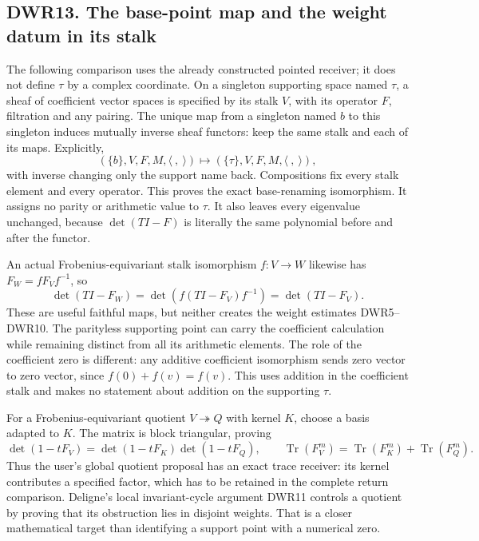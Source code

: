 \subsection{DWR13. The base-point map and the weight datum in its
stalk}\label{dwr13.-the-base-point-map-and-the-weight-datum-in-its-stalk}

The following comparison uses the already constructed pointed receiver;
it does not define \(\tau\) by a complex coordinate. On a singleton
supporting space named \(\tau\), a sheaf of coefficient vector spaces is
specified by its stalk \(V\), with its operator \(F\), filtration and
any pairing. The unique map from a singleton named \(b\) to this
singleton induces mutually inverse sheaf functors: keep the same stalk
and each of its maps. Explicitly, \[
(\{b\},V,F,M,\langle\ ,\ \rangle)
\longmapsto(\{\tau\},V,F,M,\langle\ ,\ \rangle),
\tag{DWR13.1}
\] with inverse changing only the support name back. Compositions fix
every stalk element and every operator. This proves the exact
base-renaming isomorphism. It assigns no parity or arithmetic value to
\(\tau\). It also leaves every eigenvalue unchanged, because
\(\det(TI-F)\) is literally the same polynomial before and after the
functor.

An actual Frobenius-equivariant stalk isomorphism \(f:V\to W\) likewise
has \(F_W=fF_Vf^{-1}\), so \[
\det(TI-F_W)=\det(f(TI-F_V)f^{-1})=\det(TI-F_V).
\tag{DWR13.2}
\] These are useful faithful maps, but neither creates the weight
estimates DWR5--DWR10. The parityless supporting point can carry the
coefficient calculation while remaining distinct from all its arithmetic
elements. The role of the coefficient zero is different: any additive
coefficient isomorphism sends zero vector to zero vector, since
\(f(0)+f(v)=f(v)\). This uses addition in the coefficient stalk and
makes no statement about addition on the supporting \(\tau\).

For a Frobenius-equivariant quotient \(V\twoheadrightarrow Q\) with
kernel \(K\), choose a basis adapted to \(K\). The matrix is block
triangular, proving \[
\det(1-tF_V)=\det(1-tF_K)\det(1-tF_Q),
\qquad\operatorname{Tr}(F_V^m)=\operatorname{Tr}(F_K^m)+\operatorname{Tr}(F_Q^m).
\tag{DWR13.3}
\] Thus the user's global quotient proposal has an exact trace receiver:
its kernel contributes a specified factor, which has to be retained in
the complete return comparison. Deligne's local invariant-cycle argument
DWR11 controls a quotient by proving that its obstruction lies in
disjoint weights. That is a closer mathematical target than identifying
a support point with a numerical zero.

